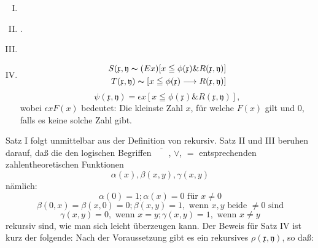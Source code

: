 \documentclass{scrartcl}
\begin{document}
\begin{enumerate}[I.]
	\item {}
	\item {}.
	\item {}
	
	\item {}

	\begin{equation*}
		\begin{aligned}
			S(\mathfrak{x}, \mathfrak{y} \thicksim (Ex)[x \leqq \phi(\mathfrak{x}) \& R(\mathfrak{x}, \mathfrak{y})]\\
			T(\mathfrak{x}, \mathfrak{y}) \thicksim [x \leqq \phi(\mathfrak{x}) \longrightarrow R(\mathfrak{x}, \mathfrak{y})]
		\end{aligned}
	\end{equation*}
	\begin{equation*}
		\psi(\mathfrak{x}, \mathfrak{y}) = \epsilon x[x \leqq \phi(\mathfrak{x}) \& R(\mathfrak{x}, \mathfrak{y})],
	\end{equation*}
	wobei $\epsilon x F(x)$ bedeutet: Die kleinste 
	Zahl $x$, für welche $F(x)$ gilt und $0$, falls es 
	keine solche Zahl gibt.
\end{enumerate}

Satz I folgt unmittelbar aus der Definition von \glqq rekursiv\grqq. Satz II und III beruhen darauf, daß die den logischen Begriffen $\overline{\phantom{XX}}$, $\lor$, $=$ entsprechenden zahlentheoretischen Funktionen
\begin{equation*}
	\alpha(x), \beta(x, y), \gamma(x, y)
\end{equation*}
nämlich:
\begin{equation*}
	\alpha(0) = 1; \alpha(x) = 0\text{ für } x \not = 0
\end{equation*}
\begin{equation*}
	\beta(0, x) = \beta(x, 0) = 0; \beta(x, y) = 1,
	\text{ wenn } x, y \text{ beide } \not = 0 \text{ sind}
\end{equation*}
\begin{equation*}
	\gamma(x, y) = 0, \text{ wenn } x = y; \gamma(x, y) = 1, \text{ wenn } x \not = y
\end{equation*}
rekursiv sind, wie man sich leicht überzeugen kann. Der
Beweis für Satz IV ist kurz der folgende: Nach der 
Voraussetzung gibt es ein rekursives $\rho(\mathfrak{x}, \mathfrak{y})$, so daß:
\end{document}
